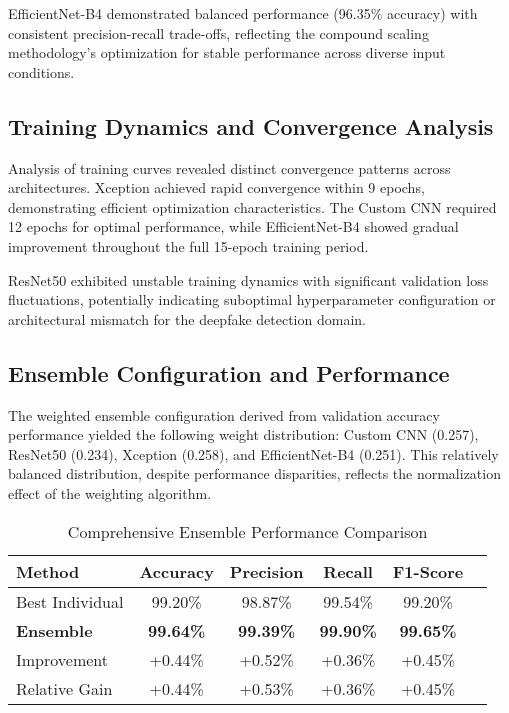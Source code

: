 \documentclass[conference]{IEEEtran}
\begin{document}
EfficientNet-B4 demonstrated balanced performance (96.35\% accuracy) with consistent precision-recall trade-offs, reflecting the compound scaling methodology's optimization for stable performance across diverse input conditions.

\subsection{Training Dynamics and Convergence Analysis}

Analysis of training curves revealed distinct convergence patterns across architectures. Xception achieved rapid convergence within 9 epochs, demonstrating efficient optimization characteristics. The Custom CNN required 12 epochs for optimal performance, while EfficientNet-B4 showed gradual improvement throughout the full 15-epoch training period.

ResNet50 exhibited unstable training dynamics with significant validation loss fluctuations, potentially indicating suboptimal hyperparameter configuration or architectural mismatch for the deepfake detection domain.

\subsection{Ensemble Configuration and Performance}

The weighted ensemble configuration derived from validation accuracy performance yielded the following weight distribution: Custom CNN (0.257), ResNet50 (0.234), Xception (0.258), and EfficientNet-B4 (0.251). This relatively balanced distribution, despite performance disparities, reflects the normalization effect of the weighting algorithm.

\begin{table}[htbp]
\caption{Comprehensive Ensemble Performance Comparison}
\begin{center}
\begin{tabular}{lccccc}
\toprule
\textbf{Method} & \textbf{Accuracy} & \textbf{Precision} & \textbf{Recall} & \textbf{F1-Score} \\
\midrule
Best Individual & 99.20\% & 98.87\% & 99.54\% & 99.20\%  \\
\textbf{Ensemble} & \textbf{99.64\%} & \textbf{99.39\%} & \textbf{99.90\%} & \textbf{99.65\%} \\
\midrule
Improvement & +0.44\% & +0.52\% & +0.36\% & +0.45\%  \\
Relative Gain & +0.44\% & +0.53\% & +0.36\% & +0.45\%  \\
\bottomrule
\end{tabular}
\label{tab:comprehensive_ensemble}
\end{center}
\end{table}
\end{document}
